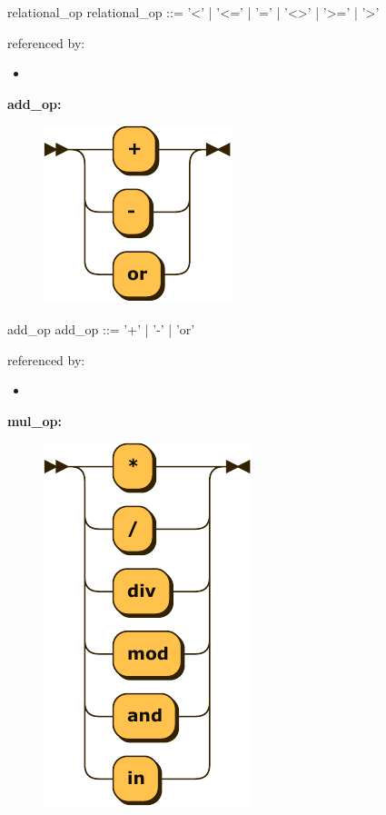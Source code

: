 \documentclass[10pt,a4paper,twoside]{article}
\providecommand{\tightlist}{%
  \setlength{\itemsep}{0pt}\setlength{\parskip}{0pt}}
\newcounter{grammarbox}[section]
\begin{document}
\begin{grammarbox}{relational\_op}
\vspace{0.5em}
relational\_op
         ::= '<'
           | '<='
           | '='
           | '<>'
           | '>='
           | '>'
\end{grammarbox}

referenced by:

\begin{itemize}
\tightlist
\item
\end{itemize}

\textbf{add\_op:}

\begin{figure}[H]
\centering
\includegraphics{diagram/add_op.pdf}

\end{figure}

\begin{grammarbox}{add\_op}
\vspace{0.5em}
add\_op   ::= '+'
           | '-'
           | 'or'
\end{grammarbox}

referenced by:

\begin{itemize}
\tightlist
\item
\end{itemize}

\textbf{mul\_op:}

\begin{figure}[H]
\centering
\includegraphics{diagram/mul_op.pdf}

\end{figure}
\end{document}
